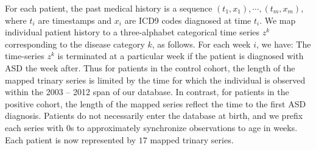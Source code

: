 \documentclass[onecolumn,,10pt]{IEEEtran}
\newif\ifFIGS
\gdef\treatment{positive\xspace}
\begin{document}
For each patient, the past  medical history is a sequence $(t_1,x_1),\cdots,(t_m,x_m)$, where $t_i$ are timestamps and $x_i$ are ICD9 codes diagnosed at time $t_i$.  We map individual patient history to a three-alphabet categorical time series $z^k$ corresponding to the disease category $k$,  as follows. For each week $i$, we have: 
\noindent
                The time-series $z^k$ is terminated at a particular week if the patient is diagnosed with ASD the week after. Thus for patients in the control cohort, the length of the mapped trinary series is limited by the time for which the individual is observed within the  2003 -- 2012 span of our database. In contrast, for patients in  the \treatment cohort, the length of the mapped series reflect the time to the first ASD diagnosis. Patients do not necessarily enter the database at birth, and we prefix each series with 0s to  approximately synchronize observations to age in weeks. Each patient is now represented by $17$ mapped trinary series.
\ifFIGS
\end{document}
